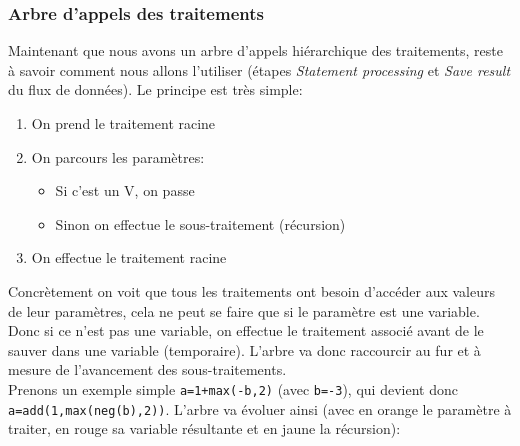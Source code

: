 \documentclass[french]{article}
\begin{document}
			\subsubsection{Arbre d'appels des traitements}
				\label{subsubsec:arbre-d-appels-des-traitements}
				Maintenant que nous avons un arbre d'appels hiérarchique des traitements, reste à savoir comment nous allons l'utiliser (étapes \textit{Statement processing} et \textit{Save result} du flux de données). Le principe est très simple: 
				
				\begin{enumerate}
					\item On prend le traitement racine
					\item On parcours les paramètres:
					\begin{itemize}
						\item Si c'est un V, on passe
						\item Sinon on effectue le sous-traitement (récursion)
					\end{itemize}
					\item On effectue le traitement racine
				\end{enumerate}
				
				Concrètement on voit que tous les traitements ont besoin d'accéder aux valeurs de leur paramètres, cela ne peut se faire que si le paramètre est une variable. Donc si ce n'est pas une variable, on effectue le traitement associé avant de le sauver dans une variable (temporaire). L'arbre va donc raccourcir au fur et à mesure de l'avancement des sous-traitements.\\
				
				Prenons un exemple simple \texttt{a=1+max(-b,2)} (avec \texttt{b=-3}), qui devient donc \texttt{a=add(1,max(neg(b),2))}. L'arbre va évoluer ainsi (avec en orange le paramètre à traiter, en rouge sa variable résultante et en jaune la récursion):
				
\end{document}
